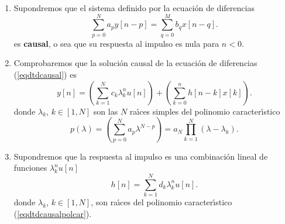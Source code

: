 \begin{enumerate}

\item Supondremos que el sistema definido por la ecuaci\'{o}n de diferencias 
\begin{equation}
   \sum_{p=0}^{N}a_{p}y\left[ n-p\right] =\sum_{q=0}^{M}b_{q}x\left[ n-q\right]. \label{eqdtdcausal}
\end{equation}
es \textbf{causal}, o sea que su respuesta al impulso es nula para $n < 0$.

\item Comprobaremos que la soluci\'{o}n causal de la ecuaci\'{o}n de diferencias (\ref{eqdtdcausal}) es
\begin{equation}
   y[n] = \left( \sum_{k=1}^{N} c_{k} \lambda_{k}^{n} u[n] \right) +
     \left( \sum_{k=0}^{n} h[n-k] x[k] \right). \label{solgenecdif}
\end{equation}
donde $\lambda_{k}$, $k \in [1,N]$ son las $N$ ra\'{\i}ces simples del polinomio caracter\'{\i}stico
\begin{equation}
  p(\lambda) = \left( \sum_{p=0}^{N}a_{p}\lambda ^{N-p}\right) = 
  a_{N} \prod_{k=1}^{N} \left( \lambda - \lambda_{k} \right). \label{eqdtdcausalpolcar}
\end{equation}

\item Supondremos que la respuesta al impulso es una combinaci\'{o}n lineal de funciones 
$\lambda_{k}^{n} u[n]$
\begin{equation}
   h[n] = \sum_{k=1}^{N} d_{k} \lambda_{k}^{n} u[n].
\end{equation}
donde $\lambda_{k}$, $k \in [1,N]$, son ra\'{\i}ces del polinomio caracter\'{\i}stico 
(\ref{eqdtdcausalpolcar}).


\end{enumerate}
